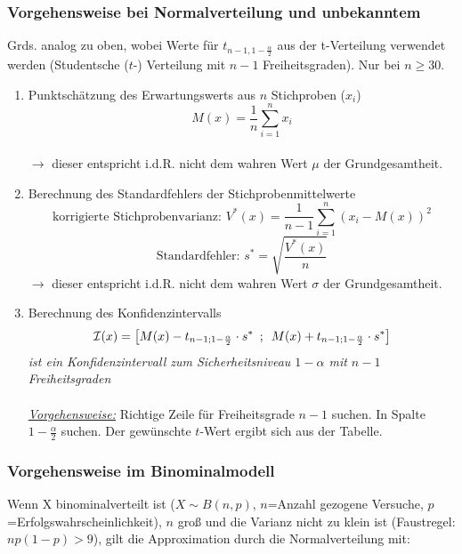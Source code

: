 \subsubsection{Vorgehensweise bei Normalverteilung und \textbf{unbekanntem} \boldmath{\(\sigma\)}}

Grds. analog zu oben, wobei Werte für \(t_{n-1,1-\frac{\alpha}{2}}\) aus der t-Verteilung verwendet werden (Studentsche (\(t\)-) Verteilung mit \(n-1\) Freiheitsgraden).  Nur bei \(n\geq 30\).

\begin{enumerate}
    \item Punktschätzung des Erwartungswerts aus \(n\) Stichproben (\(x_i\))
            \[M(x)=\frac{1}{n}\sum_{i=1}^{n}x_i\]\\
            \(\rightarrow\) dieser entspricht i.d.R. nicht dem wahren Wert \(\mu\) der Grundgesamtheit.
    \item Berechnung des Standardfehlers der Stichprobenmittelwerte
        \[\text{korrigierte Stichprobenvarianz: }V^*(x)=\frac{1}{n-1}\sum_{i=1}^{n}(x_i-M(x))^2\]
        \[\text{Standardfehler: }s^*=\sqrt{\frac{V^*(x)}{n}}\]
        \(\rightarrow\) dieser entspricht i.d.R. nicht dem wahren Wert \(\sigma\) der Grundgesamtheit.
    \item Berechnung des Konfidenzintervalls
    \begin{equation*}
        \mathcal{I}(x) = \left[M(x) - t_{n-1;1-\frac{\alpha}{2}} \cdot s^*\hspace{0.5em}; \hspace{0.5em}M(x) + t_{n-1;1-\frac{\alpha}{2}} \cdot s
        ^*\right]
    \end{equation*}
    \emph{ist ein Konfidenzintervall zum Sicherheitsniveau \(1-\alpha\) mit \(n-1\) Freiheitsgraden}\\\\
    \underline{\emph{Vorgehensweise:}} Richtige Zeile für Freiheitsgrade \(n-1\) suchen. In Spalte \(1-\frac{\alpha}{2}\) suchen. Der gewünschte \(t\)-Wert ergibt sich aus der Tabelle.\\
\end{enumerate}

\subsubsection{Vorgehensweise im Binominalmodell}

Wenn X binominalverteilt ist (\(X \sim  B(n, p)\), \(n\)=Anzahl gezogene Versuche, \(p\)=Erfolgswahrscheinlichkeit), \(n\) groß und die Varianz nicht zu klein ist (Faustregel: \(np(1-p) > 9\)), gilt die Approximation durch die Normalverteilung mit:

